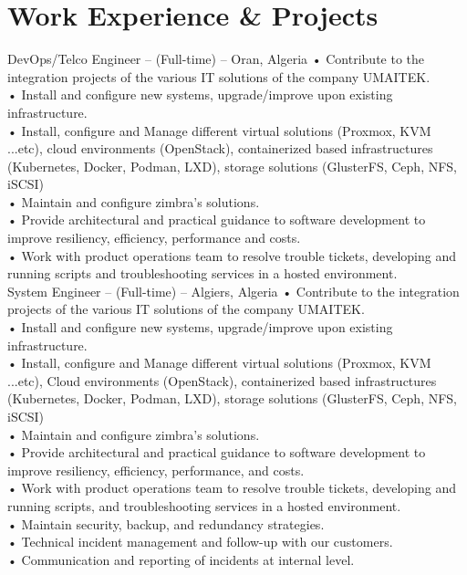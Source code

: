 \documentclass{cv}
\begin{document}
\section{Work Experience \& Projects}
{DevOps/Telco Engineer -- (Full-time)}
{\lab -- Oran, Algeria\vspace{.3cm}}
{
    • Contribute to the integration projects of the various IT solutions of the company UMAITEK.\\
    • Install and configure new systems, upgrade/improve upon existing infrastructure.\\
    • Install, configure and Manage different virtual solutions (Proxmox, KVM ...etc), 
      cloud environments (OpenStack), 
      containerized based infrastructures (Kubernetes, Docker, Podman, LXD), 
      storage solutions (GlusterFS, Ceph, NFS, iSCSI)  \\
    • Maintain and configure zimbra's solutions.\\
    • Provide architectural and practical guidance to software development to improve resiliency, efficiency, performance and costs.\\
    • Work with product operations team to resolve trouble tickets, developing and running scripts and troubleshooting services in a hosted environment.\\
}
{System Engineer -- (Full-time)}
{\umtk -- Algiers, Algeria\vspace{.3cm}}
{
    • Contribute to the integration projects of the various IT solutions of the company UMAITEK.\\
    • Install and configure new systems, upgrade/improve upon existing infrastructure.\\
    • Install, configure and Manage different virtual solutions (Proxmox, KVM ...etc), Cloud environments (OpenStack), containerized based infrastructures (Kubernetes, Docker, Podman, LXD), storage solutions (GlusterFS, Ceph, NFS, iSCSI)  \\
    • Maintain and configure zimbra's solutions.\\
    • Provide architectural and practical guidance to software development to improve resiliency, efficiency, performance, and costs.\\
    • Work with product operations team to resolve trouble tickets, developing and running scripts, and troubleshooting services in a hosted environment.\\
    • Maintain security, backup, and redundancy strategies.\\
    • Technical incident management and follow-up with our customers.\\
    • Communication and reporting of incidents at internal level.\\

}
\end{document}
